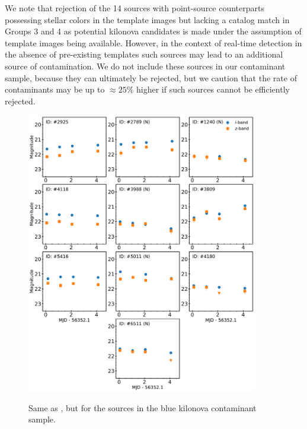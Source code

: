 We note that rejection of the 14 sources with point-source counterparts possessing stellar colors in the template images but lacking a catalog match in Groups 3 and 4 as potential kilonova candidates is made under the assumption of template images being available. However, in the context of real-time detection in the absence of pre-existing templates such sources may lead to an additional source of contamination. We do not include these sources in our contaminant sample, because they can ultimately be rejected, but we caution that the rate of contaminants may be up to $\approx 25\%$ higher if such sources cannot be efficiently rejected.

\begin{figure}[!t]
\begin{center}
\hspace*{-0.1in}
\scalebox{1.}
{\includegraphics[width=0.9\textwidth]{./figs/chapter3/f5.pdf}}
\caption{Same as , but for the sources in the blue kilonova contaminant sample.}
\label{fig:ch3_final_lc_blue}
\end{center}
\vspace{1.1cm}
\end{figure}

